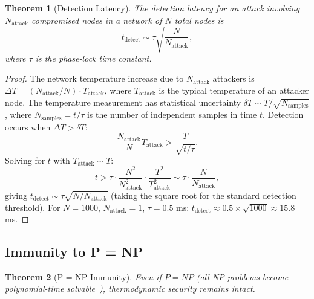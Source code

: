 \documentclass[11pt,twocolumn,a4paper]{article}
\newtheorem{theorem}{Theorem}[section]
\theoremstyle{definition}
\begin{document}
\begin{theorem}[Detection Latency]\label{thm:detection_latency}
The detection latency for an attack involving $N_{\mathrm{attack}}$ compromised nodes in a
network of $N$ total nodes is
\begin{equation}\label{eq:detection_latency}
  t_{\mathrm{detect}} \sim \tau \sqrt{\frac{N}{N_{\mathrm{attack}}}},
\end{equation}
where $\tau$ is the phase-lock time constant.
\end{theorem}

\begin{proof}
The network temperature increase due to $N_{\mathrm{attack}}$ attackers is
$\Delta T = (N_{\mathrm{attack}}/N) \cdot T_{\mathrm{attack}}$, where
$T_{\mathrm{attack}}$ is the typical temperature of an attacker node. The temperature
measurement has statistical uncertainty $\delta T \sim T/\sqrt{N_{\mathrm{samples}}}$,
where $N_{\mathrm{samples}} = t/\tau$ is the number of independent samples in time $t$.
Detection occurs when $\Delta T > \delta T$:
\begin{equation}
  \frac{N_{\mathrm{attack}}}{N} T_{\mathrm{attack}} > \frac{T}{\sqrt{t/\tau}}.
\end{equation}
Solving for $t$ with $T_{\mathrm{attack}} \sim T$:
\begin{equation}
  t > \tau \cdot \frac{N^2}{N_{\mathrm{attack}}^2} \cdot \frac{T^2}{T_{\mathrm{attack}}^2}
  \sim \tau \cdot \frac{N}{N_{\mathrm{attack}}},
\end{equation}
giving $t_{\mathrm{detect}} \sim \tau\sqrt{N/N_{\mathrm{attack}}}$ (taking the square root
for the standard detection threshold).
For $N = 1000$, $N_{\mathrm{attack}} = 1$, $\tau = 0.5$ ms:
$t_{\mathrm{detect}} \approx 0.5 \times \sqrt{1000} \approx 15.8$ ms.
\end{proof}

\subsection{Immunity to P = NP}\label{sec:security:pnp}

\begin{theorem}[P = NP Immunity]\label{thm:pnp}
Even if $P = NP$ (all NP problems become polynomial-time solvable~\cite{cook1971}),
thermodynamic security remains intact.
\end{theorem}
\end{document}

